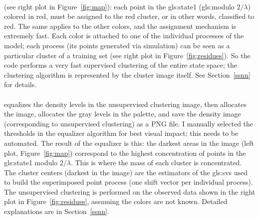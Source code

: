 \documentclass[10pt]{article}
\begin{document}
\quad \\
 (see right plot in Figure~\ref{fig:map}): each point in the \gls{gls:state1} (\gls{gls:modulo} $2/\lambda$) colored in red, must be assigned to the red cluster, or in other words, classified to red. The same applies to the other colors, and the assignment mechanism is extremely fast. Each color is attached to one of the individual processes of the model; each process (its points generated via simulation) can be seen as a particular cluster of a training set 
(see right plot in Figure~\ref{fig:residues}).  So the code performs a very fast supervised clustering of the entire state space; the clustering algorithm is represented by the cluster image itself. See Section~\ref{ssnn} for details. \\
\quad \\
 equalizes the density levels in the unsupervised clustering image, then allocates the image, allocates the gray levels in the palette, and save the density image 
(corresponding to unsupervised clustering) as a PNG file. I manually selected the thresholds in the equalizer algorithm for best visual
impact; this needs to be automated.  The result of the equalizer is this: the darkest areas in the image (left plot, Figure~\ref{fig:map}) correspond to the highest 
concentration of points in the \gls{gls:state1} modulo $2/\lambda$. This is where the mass of each cluster is concentrated. The cluster centers (darkest in the image) are the estimators of the \glspl{gls:sv} used to build the superimposed point process (one shift vector per individual process).
The unsupervised clustering is performed on the observed data shown in the right plot in Figure~\ref{fig:residues}, assuming the colors are not known. Detailed explanations are in Section~\ref{ssnn}. 
\end{document}

